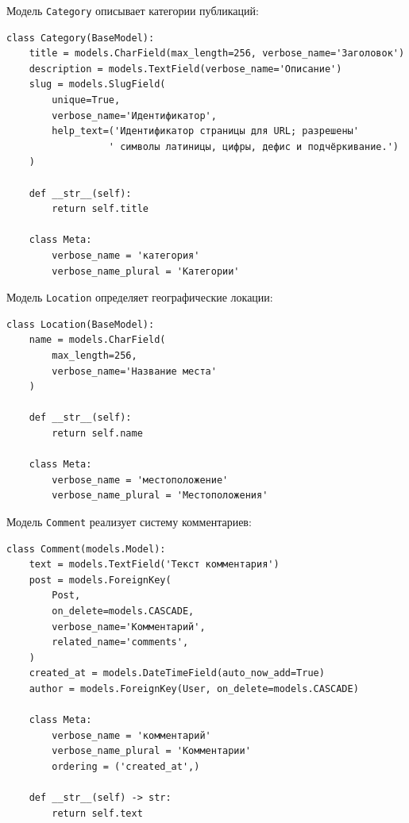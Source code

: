 \documentclass[pract,och,bachelor]{SCWorks}
\begin{document}
Модель \texttt{Category} описывает категории публикаций:

\begin{listing}[H]
\begin{verbatim}
class Category(BaseModel):
    title = models.CharField(max_length=256, verbose_name='Заголовок')
    description = models.TextField(verbose_name='Описание')
    slug = models.SlugField(
        unique=True,
        verbose_name='Идентификатор',
        help_text=('Идентификатор страницы для URL; разрешены'
                  ' символы латиницы, цифры, дефис и подчёркивание.')
    )

    def __str__(self):
        return self.title

    class Meta:
        verbose_name = 'категория'
        verbose_name_plural = 'Категории'
\end{verbatim}
\caption{Модель категории Category}
\end{listing}

Модель \texttt{Location} определяет географические локации:

\begin{listing}[H]
\begin{verbatim}
class Location(BaseModel):
    name = models.CharField(
        max_length=256,
        verbose_name='Название места'
    )

    def __str__(self):
        return self.name

    class Meta:
        verbose_name = 'местоположение'
        verbose_name_plural = 'Местоположения'
\end{verbatim}
\caption{Модель местоположения Location}
\end{listing}

Модель \texttt{Comment} реализует систему комментариев:

\begin{listing}[H]
\begin{verbatim}
class Comment(models.Model):
    text = models.TextField('Текст комментария')
    post = models.ForeignKey(
        Post,
        on_delete=models.CASCADE,
        verbose_name='Комментарий',
        related_name='comments',
    )
    created_at = models.DateTimeField(auto_now_add=True)
    author = models.ForeignKey(User, on_delete=models.CASCADE)

    class Meta:
        verbose_name = 'комментарий'
        verbose_name_plural = 'Комментарии'
        ordering = ('created_at',)

    def __str__(self) -> str:
        return self.text
\end{verbatim}
\caption{Модель комментария Comment}
\end{listing}
\end{document}
